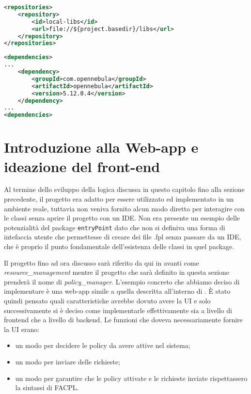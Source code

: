 \begin{lstlisting}[language=XML, xleftmargin=1em, caption=Repository locale, label=code:libsxml]
<repositories>
    <repository>
        <id>local-libs</id>
        <url>file://${project.basedir}/libs</url>
    </repository>
</repositories>
\end{lstlisting}
\begin{lstlisting}[language=XML, xleftmargin=1em, caption=Dipendenza di OpenNebula, label=code:dependencyOpenNebula]
<dependencies>
...
    <dependency>
        <groupId>com.opennebula</groupId>
        <artifactId>opennebula</artifactId>
        <version>5.12.0.4</version>
    </dependency>
...
<dependencies>
\end{lstlisting}

\section{Introduzione alla Web-app e ideazione del front-end}
Al termine dello sviluppo della logica discussa in questo capitolo fino alla sezione precedente, il progetto era adatto per essere utilizzato ed implementato in un ambiente reale, tuttavia non veniva fornito alcun modo diretto per interagire con le classi senza aprire il progetto con un IDE. Non era presente un esempio delle potenzialità del package \texttt{entryPoint} dato che non si definiva una forma di intefaccia utente che permettesse di creare dei file .fpl senza passare da un IDE, che è proprio il punto fondamentale dell'esistenza delle classi in quel package.\par
Il progetto fino ad ora discusso sarà riferito da qui in avanti come \emph{resource\_management} mentre il progetto che sarà definito in questa sezione prenderà il nome di \emph{policy\_manager}.
L'esempio concreto che abbiamo deciso di implementare è una web-app simile a quella descritta all'interno di \cite{10.1007/978-3-319-08260-8_6}. È stato quindi pensato quali caratteristiche avrebbe dovuto avere la UI e solo successivamente si è deciso come implementarle effettivamente sia a livello di frontend che a livello di backend. Le funzioni che doveva necessariamente fornire la UI erano:
\begin{itemize}
    \item un modo per decidere le policy da avere attive nel sistema;
    \item un modo per inviare delle richieste;
    \item un modo per garantire che le policy attivate e le richieste inviate rispettassero la sintassi di FACPL.
\end{itemize}
